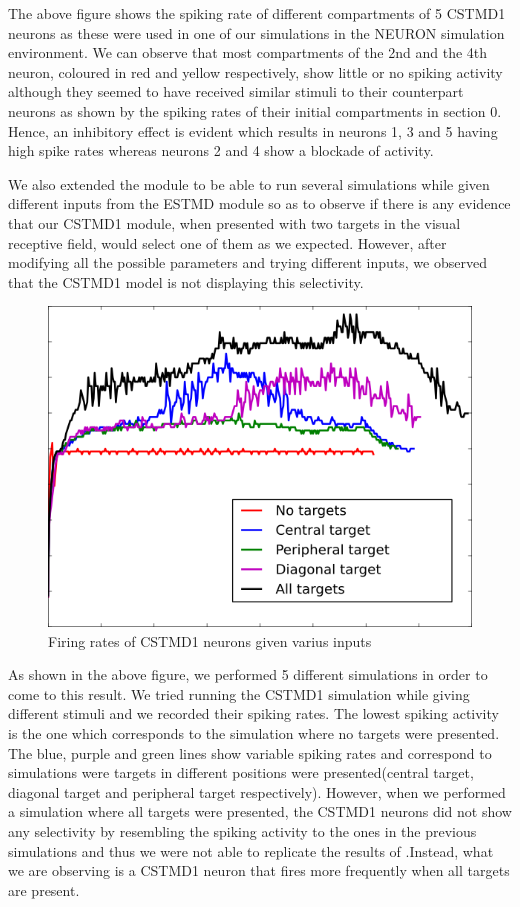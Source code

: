 \documentclass[a4paper,11pt]{article}
\begin{document}
The above figure shows the spiking rate of different compartments of 5 CSTMD1 neurons as these were used in one of our simulations in the NEURON simulation environment. We can observe that most compartments of the 2nd and the 4th neuron, coloured in red and yellow respectively, show little or no spiking activity although they seemed to have received similar stimuli to their counterpart neurons as shown by the spiking rates of their initial compartments in section 0. Hence, an inhibitory effect is evident which results in neurons 1, 3 and 5 having high spike rates whereas neurons 2 and 4 show a blockade of activity.

We also extended the module to be able to run several simulations while given different inputs from the ESTMD module so as to observe if there is any evidence that our CSTMD1 module, when presented with two targets in the visual receptive field, would select one of them as we expected. However, after modifying all the possible parameters and trying different inputs, we observed that the CSTMD1 model is not displaying this selectivity.

\begin{figure}[h]
\centering
\includegraphics[scale = 0.5]{3targets}
\caption{Firing rates of CSTMD1 neurons given varius inputs}
\end{figure}

As shown in the above figure, we performed 5 different simulations in order to come to this result. We tried running the CSTMD1 simulation while giving different stimuli and we recorded their spiking rates. The lowest spiking activity is the one which corresponds to the simulation where no targets were presented. The blue, purple and green lines show variable spiking rates and correspond to simulations were targets in different positions were presented(central target, diagonal target and peripheral target respectively). However, when we performed a simulation where all targets were presented, the CSTMD1 neurons did not show any selectivity by resembling the spiking activity to the ones in the previous simulations and thus we were not able to replicate the results of \cite{w13}.Instead, what we are observing is a CSTMD1 neuron that fires more frequently when all targets are present.
\end{document}
